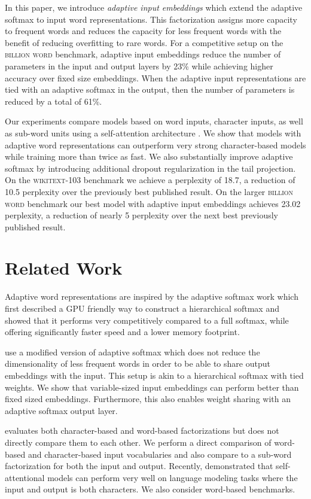 \documentclass{article} \usepackage{iclr2019_conference,times}
\def\gbw{\textsc{billion word}}
\def\wiki{\textsc{wikitext-103}}
\begin{document}
In this paper, we introduce \emph{adaptive input embeddings} which extend the adaptive softmax to input word representations. 
This factorization assigns more capacity to frequent words and reduces the capacity for less frequent words with the benefit of reducing overfitting to rare words.
For a competitive setup on the \gbw{} benchmark, adaptive input embeddings reduce the number of parameters in the input and output layers by 23\% while achieving higher accuracy over fixed size embeddings.
When the adaptive input representations are tied with an adaptive softmax in the output, then the number of parameters is reduced by a total of 61\%.

Our experiments compare models based on word inputs, character inputs, as well as sub-word units using a self-attention architecture \citep{vaswani2017transformer}.
We show that models with adaptive word representations can outperform very strong character-based models while training more than twice as fast.
We also substantially improve adaptive softmax by introducing additional dropout regularization in the tail projection.
On the \wiki{} benchmark we achieve a perplexity of 18.7, a reduction of 10.5 perplexity over the previously best published result.
On the larger \gbw{} benchmark our best model with adaptive input embeddings achieves 23.02 perplexity, a reduction of nearly 5 perplexity over the next best previously published result. 
\section{Related Work}

Adaptive word representations are inspired by the adaptive softmax work \cite{grave2017icml} which first described a GPU friendly way to construct a hierarchical softmax and showed that it performs very competitively compared to a full softmax, while offering significantly faster speed and a lower memory footprint.

\citet{merity2018lm} use a modified version of adaptive softmax which does not reduce the dimensionality of less frequent words in order to be able to share output embeddings with the input. 
This setup is akin to a hierarchical softmax with tied weights.
We show that variable-sized input embeddings can perform better than fixed sized embeddings. 
Furthermore, this also enables weight sharing with an adaptive softmax output layer.

\citet{merity2018lm} evaluates both character-based and word-based factorizations but does not directly compare them to each other. 
We perform a direct comparison of word-based and character-based input vocabularies and also compare to a sub-word factorization for both the input and output.
Recently, \citet{alrfou2018chartrans} demonstrated that self-attentional models can perform very well on language modeling tasks where the input and output is both characters.
We also consider word-based benchmarks.
 
\end{document}
